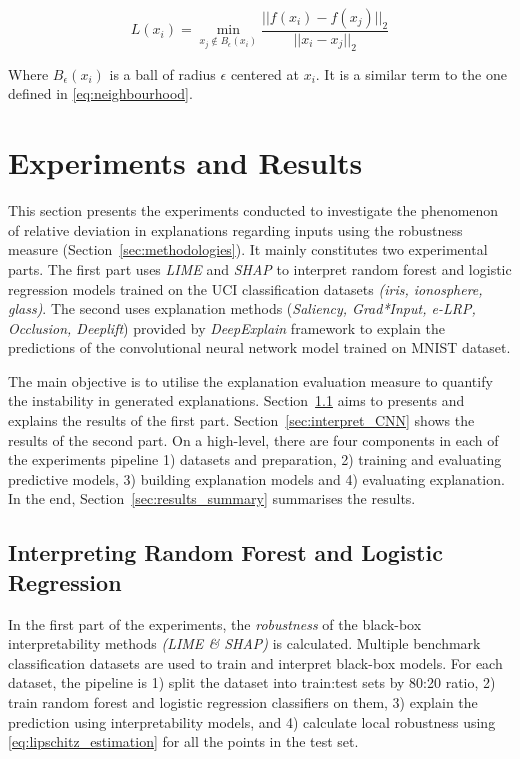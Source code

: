 \documentclass[english]{tktltiki2}
\theoremstyle{definition}
\theoremstyle{remark}
\begin{document}
\begin{equation}\label{eq:lipschitz_estimation_as_a_separability_measure}
L(x_i) = \min_{x_j \notin B_{\epsilon}(x_i)}  \frac{||f(x_i) - f(x_j)||_{2}}{||x_i - x_j||_{2}}
\end{equation}

Where $B_{\epsilon}(x_{i})$ is a ball of radius $\epsilon$ centered at $x_i$. It is a similar term to the one defined in \eqref{eq:neighbourhood}. 


\section{Experiments and Results}\label{sec:experiments_and_results} %
This section presents the experiments conducted to investigate the phenomenon of relative deviation in explanations regarding inputs using the robustness measure (Section~\ref{sec:methodologies}). It mainly constitutes two experimental parts. The first part uses \textit{LIME} and \textit{SHAP} to interpret random forest and logistic regression models trained on the UCI classification datasets \textit{(iris, ionosphere, glass)}. The second uses explanation methods (\textit{Saliency, Grad*Input, e-LRP, Occlusion, Deeplift}) provided by \textit{DeepExplain} framework to explain the predictions of the convolutional neural network model trained on MNIST dataset.

The main objective is to utilise the explanation evaluation measure to quantify the instability in generated explanations. Section~\ref{sec:interpret_radnom_forest_and_logistic_regression} aims to presents and explains the results of the first part. Section~\ref{sec:interpret_CNN} shows the results of the second part.  On a high-level, there are four components in each of the experiments pipeline 1) datasets and preparation, 2) training and evaluating predictive models, 3) building explanation models and 4) evaluating explanation. In the end, Section~\ref{sec:results_summary} summarises the results.

\subsection{Interpreting Random Forest and Logistic Regression}\label{sec:interpret_radnom_forest_and_logistic_regression}
In the first part of the experiments, the \textit{robustness} of the black-box interpretability methods \textit{(LIME \& SHAP)} is calculated. Multiple benchmark classification datasets are used to train and interpret black-box models. For each dataset, the pipeline is 1) split the dataset into train:test sets by 80:20 ratio, 2) train random forest and logistic regression classifiers on them, 3) explain the prediction using interpretability models, and 4) calculate local robustness using \eqref{eq:lipschitz_estimation} for all the points in the test set.
\end{document}
